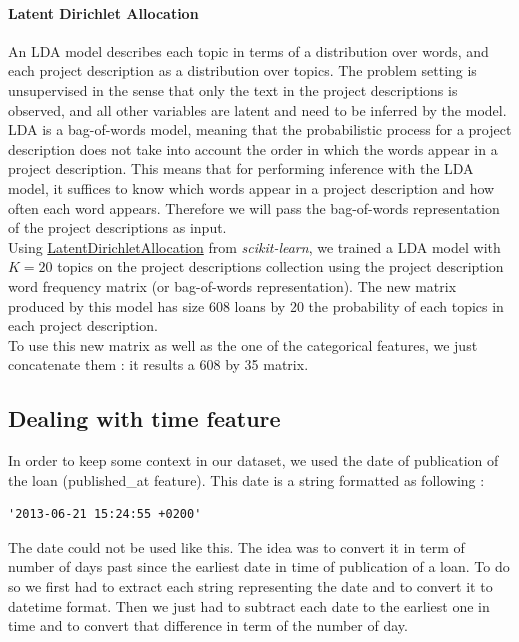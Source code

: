 		\paragraph{Latent Dirichlet Allocation}
			An LDA model describes each topic in terms of a distribution over words, and each project description as a distribution over topics. The problem setting is unsupervised in the sense that only the text in the project descriptions is observed, and all other variables are latent and need to be inferred by the model.
			LDA is a bag-of-words model, meaning that the probabilistic process for a project description does not take into account the order in which the words appear in a project description. This means that for performing inference with the LDA model, it suffices to know which words appear in a project description and how often each word appears. Therefore we will pass the bag-of-words representation of the project descriptions as input.\\

			Using \href{http://scikit-learn.org/stable/modules/generated/sklearn.decomposition.LatentDirichletAllocation.html}{LatentDirichletAllocation} from \textit{scikit-learn}, we trained a LDA model with $K=20$ topics on the project descriptions collection using the project description word frequency matrix (or bag-of-words representation). The new matrix produced by this model has size 608 loans by 20 the probability of each topics in each project description.\\

			To use this new matrix as well as the one of the categorical features, we just concatenate them : it results a 608 by 35 matrix.


	\subsection{Dealing with time feature}
		In order to keep some context in our dataset, we used the date of publication of the loan (published\_at feature). This date is a string formatted as following :
		\begin{verbatim}
'2013-06-21 15:24:55 +0200'
		\end{verbatim}
		The date could not be used like this. The idea was to convert it in term of number of days past since the earliest date in time of publication of a loan. To do so we first had to extract each string representing the date and to convert it to datetime format. Then we just had to subtract each date to the earliest one in time and to convert that difference in term of the number of day.
